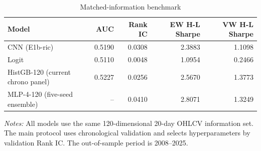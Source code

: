 \begin{table}[htbp]
\centering
\caption{Matched-information benchmark}
\label{tab:benchmark}
\begin{tabular}{lrrrr}
\toprule
Model & AUC & Rank IC & EW H-L Sharpe & VW H-L Sharpe \\
\midrule
CNN (E1b-ric) & 0.5190 & 0.0308 & 2.3883 & 1.1098 \\
Logit & 0.5110 & 0.0048 & 1.0954 & 0.2466 \\
HistGB-120 (current chrono panel) & 0.5227 & 0.0256 & 2.5670 & 1.3773 \\
MLP-4-120 (five-seed ensemble) & -- & 0.0410 & 2.8071 & 1.3249 \\
\bottomrule
\end{tabular}
\begin{minipage}{0.92\linewidth}
\footnotesize
\textit{Notes:} All models use the same 120-dimensional 20-day OHLCV information set. The main protocol uses chronological validation and selects hyperparameters by validation Rank IC. The out-of-sample period is 2008--2025.
\end{minipage}
\end{table}
